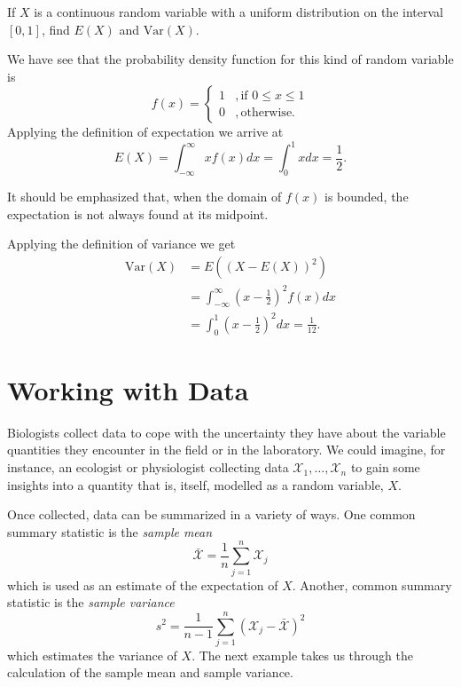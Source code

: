 \documentclass[../book.tex]{subfiles}
\begin{document}
\begin{example} \label{eg:uniform}
If \(X\) is a continuous random variable with a uniform distribution on the  interval \([0,1]\), find \(E(X)\) and \(\text{Var}(X)\).
\end{example}

\begin{solution}
We have see that the probability density function for this kind of random variable is
\begin{equation}\label{eq:rv-18}
f(x)
=
\begin{cases}
    1 &, \text{if } 0 \le  x \le 1\\
    0 &, \text{otherwise}.
\end{cases}
\end{equation}
Applying the definition of expectation we arrive at
\begin{equation}\label{eq:rv-19}
E(X) = \int_{-\infty}^\infty x f(x) dx = \int_0^1 x dx = \frac{1}{2}.
\end{equation}

It should be emphasized that, when the domain of \(f(x)\) is bounded, the expectation is not always found at its midpoint.

Applying the definition of variance we get
\begin{equation}\label{eq:rv-20}
\begin{aligned}
  \text{Var}(X)
  &= E( (X-E(X))^2 ) \\
  &= \int_{-\infty}^{\infty} \left( x - \frac{1}{2} \right)^2 f(x) dx \\
  &= \int_{0}^{1} \left( x - \frac{1}{2} \right)^2 dx = \frac{1}{12}.
\end{aligned}
\end{equation}
\end{solution}

\section{Working with Data}

Biologists collect data to cope with the uncertainty they have about the variable quantities they encounter in the field or in the laboratory. We could imagine, for instance, an ecologist or physiologist collecting data \(\mathcal{X}_1, \ldots, \mathcal{X}_n\) to gain some insights into a quantity that is, itself, modelled as a random variable, \(X\).

Once collected, data can be summarized in a variety of ways. One common summary statistic is the \emph{sample mean}
\begin{equation}\label{eq:rv-21}
\bar{\mathcal{X}} = \frac{1}{n} \sum_{j=1}^{n} \mathcal{X}_{j}
\end{equation}
which is used as an estimate of the expectation of \(X\). Another, common summary statistic is the \emph{sample variance}
\begin{equation}\label{eq:rv-22}
s^2 = \frac{1}{n-1} \sum_{j=1}^n \left( \mathcal{X}_j - \bar{\mathcal{X}} \right)^2
\end{equation}
which estimates the variance of \(X\). The next example takes us through the calculation of the sample mean and sample variance.
\end{document}
